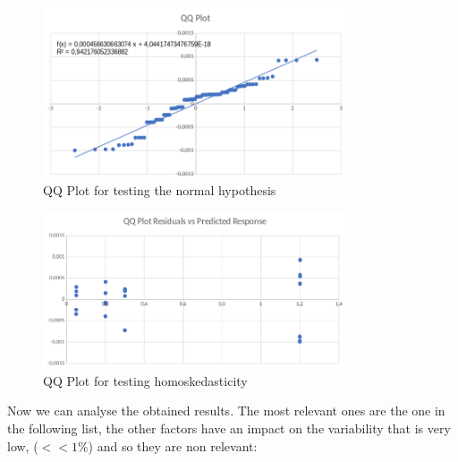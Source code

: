 \begin{figure}[H]
	\centering
	\includegraphics[width=0.8\textwidth]{img/QQplot_2kr_throughput.png}
	\caption{QQ Plot for testing the normal hypothesis}
	\label {img: qqplot_throughput}
\end{figure}

\begin{figure}[H]
	\centering
	\includegraphics[width=0.8\textwidth]{img/homoskedasticity_2kr_throughput.png}
	\caption{QQ Plot for testing homoskedasticity}
	\label {img: homoskedasticity_throughput}
\end{figure}

\noindent Now we can analyse the obtained results. The most relevant ones are the one in the following list, the other factors have an impact on the variability that is very low, ($<<1\%$) and so they are non relevant:

